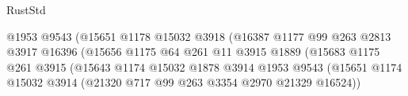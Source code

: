 \begin{lexlean}{RustStd}
\begin{coremodule}
                                                @1953
                                                @9543
                                                (@15651
                                                  @1178
                                                  @15032
                                                  @3918
                                                  (@16387
                                                    @1177
                                                    @99
                                                    @263
                                                    @2813
                                                    @3917
                                                    @16396
                                                    (@15656
                                                      @1175
                                                      @64
                                                      @261
                                                      @11
                                                      @3915
                                                      @1889
                                                      (@15683
                                                        @1175
                                                        @261
                                                        @3915
                                                        (@15643
                                                          @1174
                                                          @15032
                                                          @1878
                                                          @3914
                                                          @1953
                                                          @9543
                                                          (@15651
                                                            @1174
                                                            @15032
                                                            @3914
                                                            (@21320
                                                              @717
                                                              @99
                                                              @263
                                                              @3354
                                                              @2970
                                                              @21329
                                                              @16524))

\end{coremodule}
\end{lexlean}

